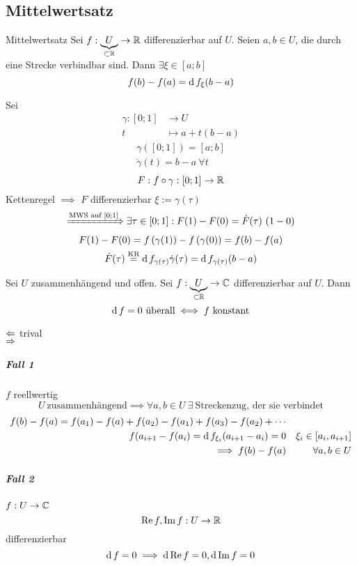 \subsection{Mittelwertsatz}
\begin{Sat}{Mittelwertsatz}
  Sei $f:\underbrace{U}_{\subset\mathbb{R}}\to \mathbb{R}$ differenzierbar auf $U$. Seien $a,b\in U$, die durch eine Strecke verbindbar sind. Dann $\exists \xi\in [a;b]$
  \[f(b)-f(a)=\operatorname{d} f_\xi(b-a)\]
\end{Sat}
\begin{Bew}
  Sei
  \begin{align*}
    \gamma:[0;1]&\to U\\
    t&\mapsto a+t(b-a)
  \end{align*}
  \begin{gather*}
    \gamma\left( [0;1] \right)=[a;b]\\
    \dot\gamma(t)=b-a\ \forall t
  \end{gather*}
  \[F:f\circ \gamma:[0;1]\to\mathbb{R}\]
  Kettenregel $\implies$ $F$ differenzierbar $\xi:=\gamma(\tau)$
  \begin{gather*}
  \xRightarrow{\text{MWS auf } [0;1]}\exists \tau\in[0;1]:F(1)-F(0)=\dot F(\tau)\ (1-0)\\
  F(1)-F(0)=f\left( \gamma(1) \right)-f\left( \gamma(0) \right)=f(b)-f(a)\\
  \dot F(\tau) \stackrel{\text{KR}}{=} \operatorname{d} f_{\gamma(\tau)} \dot\gamma (\tau)=\operatorname{d} f_{\gamma(\tau) } (b-a)
  \end{gather*}
\end{Bew}
\begin{Kor}
  Sei $U$ zusammenhängend und offen. Sei $f:\underbrace{U}_{\subset\mathbb{R}}\to \mathbb{C}$ differenzierbar auf $U$. Dann
  \[\md f=0\ \text{überall}\iff f\ \text{konstant}\]
\end{Kor}
\begin{Bew}
  $\Leftarrow$ trival\\
  $\Rightarrow$
  \subparagraph{Fall 1} $f$ reellwertig
  \[U\ \text{zusammenhängend}\implies \forall a,b\in U\ \exists\ \text{Streckenzug, der sie verbindet}\]
  \begin{align*}
    f(b)-f(a)=f(a_1)-f(a)+f(a_2)-f(a_1)+f(a_3)-f(a_2)+\cdots\\
    f(a_{i+1}-f(a_i)=\operatorname{d} f_{\xi_i}(a_{i+1}-a_i)=0 && \xi_i\in[a_i,a_{i+1}]\\
    \implies f(b)-f(a) &&\forall a,b\in U
  \end{align*}
  \subparagraph{Fall 2} $f:U\to \mathbb{C}$
  \[\operatorname{Re} f, \operatorname{Im} f:U\to\mathbb{R}\]
  differenzierbar
  \[\operatorname{d} f=0\implies \operatorname{d} \operatorname{Re} f=0,\operatorname{d} \operatorname{Im} f=0\]
\end{Bew}

